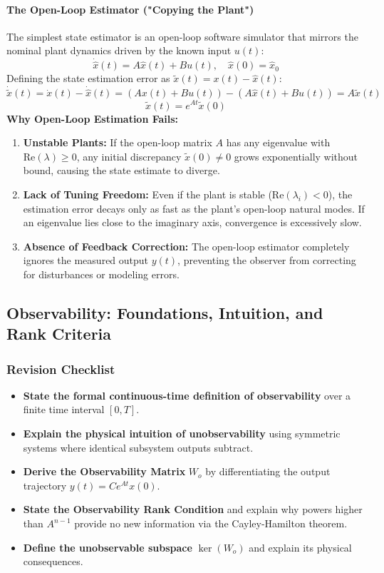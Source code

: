 \documentclass[12pt,onecolumn,twoside ]{article}
\begin{document}
	\paragraph{The Open-Loop Estimator ("Copying the Plant")}
	The simplest state estimator is an open-loop software simulator that mirrors the nominal plant dynamics driven by the known input $u(t)$: \[
	\dot{\hat{x}}(t) = A\hat{x}(t) + Bu(t), \quad \hat{x}(0) = \hat{x}_0
	\]
	Defining the state estimation error as $\tilde{x}(t) = x(t) - \hat{x}(t)$: \[
	\dot{\tilde{x}}(t) = \dot{x}(t) - \dot{\hat{x}}(t) = (Ax(t) + Bu(t)) - (A\hat{x}(t) + Bu(t)) = A\tilde{x}(t)
	\] \[
	\tilde{x}(t) = e^{At}\tilde{x}(0)
	\]
	\textbf{Why Open-Loop Estimation Fails:}
	\begin{enumerate}
		\item
		\textbf{Unstable Plants:} If the open-loop matrix $A$ has any eigenvalue with $\text{Re}(\lambda) \ge 0$, any initial discrepancy $\tilde{x}(0) \neq 0$ grows exponentially without bound, causing the state estimate to diverge.
		\item
		\textbf{Lack of Tuning Freedom:} Even if the plant is stable ($\text{Re}(\lambda_i) < 0$), the estimation error decays only as fast as the plant's open-loop natural modes. If an eigenvalue lies close to the imaginary axis, convergence is excessively slow.
		\item
		\textbf{Absence of Feedback Correction:} The open-loop estimator completely ignores the measured output $y(t)$, preventing the observer from correcting for disturbances or modeling errors.
	\end{enumerate}
	
	\subsection{Observability: Foundations, Intuition, and Rank Criteria}
	\subsubsection{Revision Checklist}
	\begin{itemize}
		\item[$\square$]
		\textbf{State the formal continuous-time definition of observability} over a finite time interval $[0, T]$.
		\item[$\square$]
		\textbf{Explain the physical intuition of unobservability} using symmetric systems where identical subsystem outputs subtract.
		\item[$\square$]
		\textbf{Derive the Observability Matrix} $W_o$ by differentiating the output trajectory $y(t) = C e^{At} x(0)$.
		\item[$\square$]
		\textbf{State the Observability Rank Condition} and explain why powers higher than $A^{n-1}$ provide no new information via the Cayley-Hamilton theorem.
		\item[$\square$]
		\textbf{Define the unobservable subspace} $\ker(W_o)$ and explain its physical consequences.
	\end{itemize}
	
\end{document}
